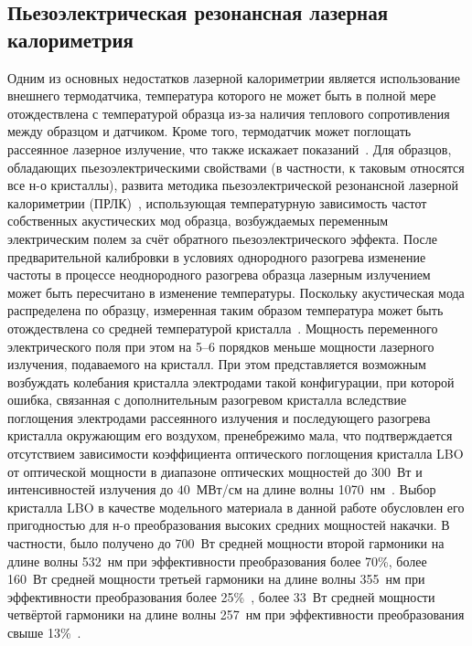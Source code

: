 \subsection{Пьезоэлектрическая резонансная лазерная калориметрия}
	
	
Одним из основных недостатков лазерной калориметрии является использование внешнего термодатчика, температура которого не может быть в полной мере отождествлена с температурой образца из-за наличия теплового сопротивления между образцом и датчиком. Кроме того, термодатчик может поглощать рассеянное лазерное излучение, что также искажает показаний~\cite{Willamowski1996}. Для образцов, обладающих пьезоэлектрическими свойствами (в частности, к таковым относятся все н-о кристаллы), развита методика пьезоэлектрической резонансной лазерной калориметрии (ПРЛК)~\cite{Ryabushkin2013}, использующая температурную зависимость частот собственных акустических мод образца, возбуждаемых переменным электрическим полем за счёт обратного пьезоэлектрического эффекта. После предварительной калибровки в условиях однородного разогрева изменение частоты в процессе неоднородного разогрева образца лазерным излучением может быть пересчитано в изменение температуры. Поскольку акустическая мода распределена по образцу, измеренная таким образом температура может быть отождествлена со средней температурой кристалла~\cite{Ryabushkin2013}. Мощность переменного электрического поля при этом на 5--6 порядков меньше мощности лазерного излучения, подаваемого на кристалл. При этом представляется возможным возбуждать колебания кристалла электродами такой конфигурации, при которой ошибка, связанная с дополнительным разогревом кристалла вследствие поглощения электродами рассеянного излучения и последующего разогрева кристалла окружающим его воздухом, пренебрежимо мала, что подтверждается отсутствием зависимости коэффициента оптического поглощения кристалла LBO от оптической мощности в диапазоне оптических мощностей до 300~Вт и интенсивностей излучения до $40$~МВт/см на длине волны 1070~нм~\cite{grishchenko2022measurements}. Выбор кристалла LBO в качестве модельного материала в данной работе обусловлен его пригодностью для н-о преобразования высоких средних мощностей накачки. В частности, было получено до 700~Вт средней мощности второй гармоники на длине волны 532~нм при эффективности преобразования более 70\%, более 160~Вт средней мощности третьей гармоники на длине волны 355~нм при эффективности преобразования более 25\%~\cite{avdokhin2014high}, более 33~Вт средней мощности четвёртой гармоники на длине волны 257~нм при эффективности преобразования свыше 13\%~\cite{schmittner25}.
